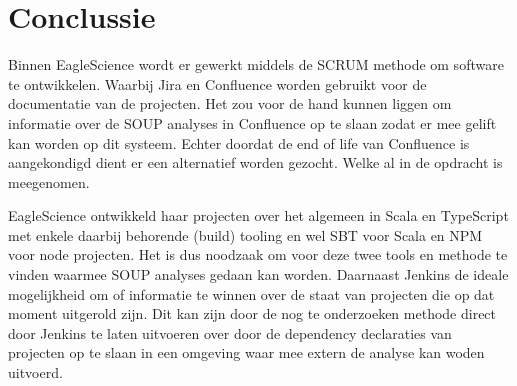 \section{Conclussie}\label{sec:ESconclussie}
Binnen EagleScience wordt er gewerkt middels de SCRUM methode om software te ontwikkelen. Waarbij Jira en Confluence worden gebruikt voor de documentatie van de projecten. Het zou voor de hand kunnen liggen om informatie over de SOUP analyses in Confluence op te slaan zodat er mee gelift kan worden op dit systeem. Echter doordat de end of life van Confluence is aangekondigd dient er een alternatief worden gezocht. Welke al in de opdracht is meegenomen.

EagleScience ontwikkeld haar projecten over het algemeen in Scala en TypeScript met enkele daarbij behorende (build) tooling en wel SBT voor Scala en NPM voor node projecten. Het is dus noodzaak om voor deze twee tools en methode te vinden waarmee SOUP analyses gedaan kan worden. Daarnaast Jenkins de ideale mogelijkheid om of informatie te winnen over de staat van projecten die op dat moment uitgerold zijn. Dit kan zijn door de nog te onderzoeken methode direct door Jenkins te laten uitvoeren over door de dependency declaraties van projecten op te slaan in een omgeving waar mee extern de analyse kan woden uitvoerd.
